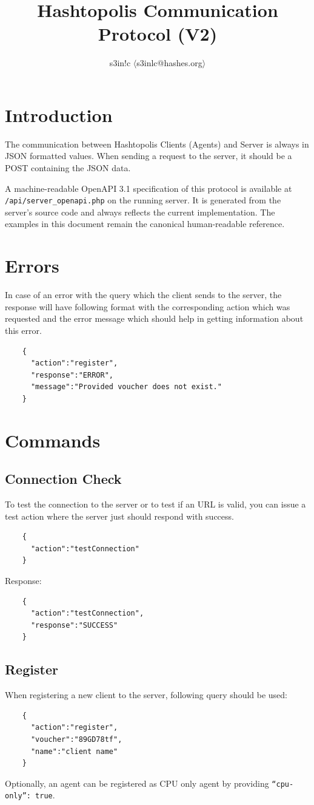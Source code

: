 \documentclass{article}
\author{s3in!c $\langle$s3inlc@hashes.org$\rangle$ }
\begin{document}
	\title{Hashtopolis Communication Protocol (V2)}
	\maketitle
	\section*{Introduction}
	The communication between Hashtopolis Clients (Agents) and Server is always in JSON formatted values. When sending a request to the server, it should be a POST containing the JSON data.

	A machine-readable OpenAPI 3.1 specification of this protocol is available at \texttt{/api/server\_openapi.php} on the running server. It is generated from the server's source code and always reflects the current implementation. The examples in this document remain the canonical human-readable reference.

	\section*{Errors}
	In case of an error with the query which the client sends to the server, the response will have following format with the corresponding action which was requested and the error message which should help in getting information about this error.
	\begin{verbatim}
	{
	  "action":"register",
	  "response":"ERROR",
	  "message":"Provided voucher does not exist."
	}
	\end{verbatim}
	\pagebreak
	\section*{Commands}
	
	\subsection*{Connection Check}
	To test the connection to the server or to test if an URL is valid, you can issue a test action where the server just should respond with success.
	\begin{verbatim}
	{
	  "action":"testConnection"
	}
	\end{verbatim}
	Response:
	\begin{verbatim}
	{
	  "action":"testConnection",
	  "response":"SUCCESS"
	} 
	\end{verbatim}

	\subsection*{Register}
	When registering a new client to the server, following query should be used:
	\begin{verbatim}
	{
	  "action":"register",
	  "voucher":"89GD78tf",
	  "name":"client name"
	}
	\end{verbatim}
	Optionally, an agent can be registered as CPU only agent by providing \texttt{``cpu-only'': true}.
\end{document}
